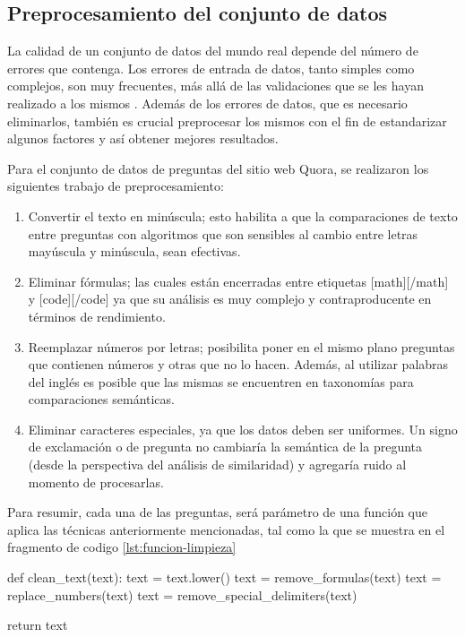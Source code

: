 \subsection{Preprocesamiento del conjunto de datos}

La calidad de un conjunto de datos del mundo real depende del número de errores que contenga. Los errores de entrada de datos, tanto simples como complejos, son muy frecuentes, más allá de las validaciones que se les hayan realizado a los mismos \citep{maletic2000data}. Además de los errores de datos, que es necesario eliminarlos, también es crucial preprocesar los mismos con el fin de estandarizar algunos factores y así obtener mejores resultados.

\bigskip Para el conjunto de datos de preguntas del sitio web Quora, se realizaron los siguientes trabajo de preprocesamiento:

\begin{enumerate}
	\item Convertir el texto en minúscula; esto habilita a que la comparaciones de texto entre preguntas con algoritmos que son sensibles al cambio entre letras mayúscula y minúscula, sean efectivas.
	\item Eliminar fórmulas; las cuales están encerradas entre etiquetas [math][/math] y [code][/code] ya que su análisis es muy complejo y contraproducente en términos de rendimiento.
	\item Reemplazar números por letras; posibilita poner en el mismo plano preguntas que contienen números y otras que no lo hacen. Además, al utilizar palabras del inglés es posible que las mismas se encuentren en taxonomías para comparaciones semánticas.
	\item Eliminar caracteres especiales, ya que los datos deben ser uniformes. Un signo de exclamación o de pregunta no cambiaría la semántica de la pregunta (desde la perspectiva del análisis de similaridad) y agregaría ruido al momento de procesarlas.
\end{enumerate}

Para resumir, cada una de las preguntas, será parámetro de una función que aplica las técnicas anteriormente mencionadas, tal como la que se muestra en el fragmento de codigo \ref{lst:funcion-limpieza}

\bigskip

\begin{python}[caption={Ejemplo de función de limpieza.}, captionpos=b,label={lst:funcion-limpieza}]
def clean_text(text):
	text = text.lower()
	text = remove_formulas(text)
	text = replace_numbers(text)
	text = remove_special_delimiters(text)

	return text
\end{python}


